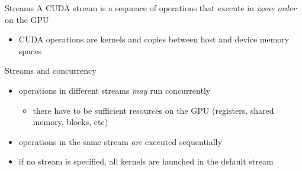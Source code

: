 \begin{frame}[fragile]{}
    \begin{info}{Streams}
        A CUDA stream is a sequence of operations that execute in \emph{issue order} on the GPU
        \begin{itemize}
            \item CUDA operations are kernels and copies between host and device memory spaces
        \end{itemize}
    \end{info}

    \begin{info}{Streams and concurrency}
        \begin{itemize}
            \item operations in different streams \emph{may} run concurrently
            \begin{itemize}
                \item there have to be sufficient resources on the GPU (registers, shared memory, blocks, etc)
            \end{itemize}
            \item operations in the same stream \emph{are} executed sequentially
            \item if no stream is specified, all kernels are launched in the default stream
        \end{itemize}
    \end{info}

\end{frame}

